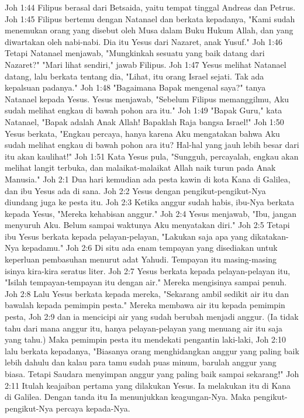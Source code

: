 Joh 1:44  Filipus berasal dari Betsaida, yaitu tempat tinggal Andreas dan Petrus.
Joh 1:45  Filipus bertemu dengan Natanael dan berkata kepadanya, "Kami sudah menemukan orang yang disebut oleh Musa dalam Buku Hukum Allah, dan yang diwartakan oleh nabi-nabi. Dia itu Yesus dari Nazaret, anak Yusuf."
Joh 1:46  Tetapi Natanael menjawab, "Mungkinkah sesuatu yang baik datang dari Nazaret?" "Mari lihat sendiri," jawab Filipus.
Joh 1:47  Yesus melihat Natanael datang, lalu berkata tentang dia, "Lihat, itu orang Israel sejati. Tak ada kepalsuan padanya."
Joh 1:48  "Bagaimana Bapak mengenal saya?" tanya Natanael kepada Yesus. Yesus menjawab, "Sebelum Filipus memanggilmu, Aku sudah melihat engkau di bawah pohon ara itu."
Joh 1:49  "Bapak Guru," kata Natanael, "Bapak adalah Anak Allah! Bapaklah Raja bangsa Israel!"
Joh 1:50  Yesus berkata, "Engkau percaya, hanya karena Aku mengatakan bahwa Aku sudah melihat engkau di bawah pohon ara itu? Hal-hal yang jauh lebih besar dari itu akan kaulihat!"
Joh 1:51  Kata Yesus pula, "Sungguh, percayalah, engkau akan melihat langit terbuka, dan malaikat-malaikat Allah naik turun pada Anak Manusia."
Joh 2:1  Dua hari kemudian ada pesta kawin di kota Kana di Galilea, dan ibu Yesus ada di sana.
Joh 2:2  Yesus dengan pengikut-pengikut-Nya diundang juga ke pesta itu.
Joh 2:3  Ketika anggur sudah habis, ibu-Nya berkata kepada Yesus, "Mereka kehabisan anggur."
Joh 2:4  Yesus menjawab, "Ibu, jangan menyuruh Aku. Belum sampai waktunya Aku menyatakan diri."
Joh 2:5  Tetapi ibu Yesus berkata kepada pelayan-pelayan, "Lakukan saja apa yang dikatakan-Nya kepadamu."
Joh 2:6  Di situ ada enam tempayan yang disediakan untuk keperluan pembasuhan menurut adat Yahudi. Tempayan itu masing-masing isinya kira-kira seratus liter.
Joh 2:7  Yesus berkata kepada pelayan-pelayan itu, "Isilah tempayan-tempayan itu dengan air." Mereka mengisinya sampai penuh.
Joh 2:8  Lalu Yesus berkata kepada mereka, "Sekarang ambil sedikit air itu dan bawalah kepada pemimpin pesta." Mereka membawa air itu kepada pemimpin pesta,
Joh 2:9  dan ia mencicipi air yang sudah berubah menjadi anggur. (Ia tidak tahu dari mana anggur itu, hanya pelayan-pelayan yang menuang air itu saja yang tahu.) Maka pemimpin pesta itu mendekati pengantin laki-laki,
Joh 2:10  lalu berkata kepadanya, "Biasanya orang menghidangkan anggur yang paling baik lebih dahulu dan kalau para tamu sudah puas minum, barulah anggur yang biasa. Tetapi Saudara menyimpan anggur yang paling baik sampai sekarang!"
Joh 2:11  Itulah keajaiban pertama yang dilakukan Yesus. Ia melakukan itu di Kana di Galilea. Dengan tanda itu Ia menunjukkan keagungan-Nya. Maka pengikut-pengikut-Nya percaya kepada-Nya.
